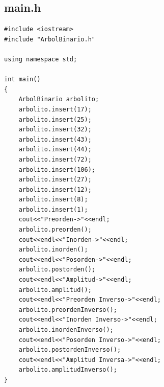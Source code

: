 \documentclass[a4paper,12pt]{article}
\begin{document}
     \subsection{main.h}
     \begin{lstlisting}
#include <iostream>
#include "ArbolBinario.h"

using namespace std;

int main()
{
    ArbolBinario arbolito;
    arbolito.insert(17);
    arbolito.insert(25);
    arbolito.insert(32);
    arbolito.insert(43);
    arbolito.insert(44);
    arbolito.insert(72);
    arbolito.insert(106);
    arbolito.insert(27);
    arbolito.insert(12);
    arbolito.insert(8);
    arbolito.insert(1);
    cout<<"Preorden->"<<endl;
    arbolito.preorden();
    cout<<endl<<"Inorden->"<<endl;
    arbolito.inorden();
    cout<<endl<<"Posorden->"<<endl;
    arbolito.postorden();
    cout<<endl<<"Amplitud->"<<endl;
    arbolito.amplitud();
    cout<<endl<<"Preorden Inverso->"<<endl;
    arbolito.preordenInverso();
    cout<<endl<<"Inorden Inverso->"<<endl;
    arbolito.inordenInverso();
    cout<<endl<<"Posorden Inverso->"<<endl;
    arbolito.postordenInverso();
    cout<<endl<<"Amplitud Inversa->"<<endl;
    arbolito.amplitudInverso();
}

     \end{lstlisting}
  
\end{document}
